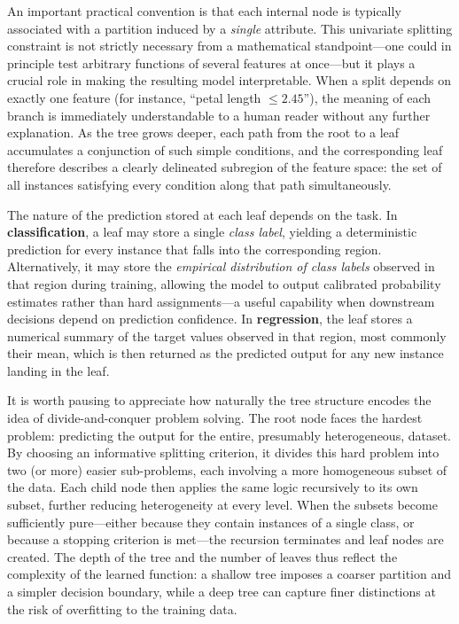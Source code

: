 An important practical convention is that each internal node is typically associated with a
partition induced by a \emph{single} attribute. This univariate splitting constraint is not
strictly necessary from a mathematical standpoint---one could in principle test arbitrary
functions of several features at once---but it plays a crucial role in making the resulting
model interpretable. When a split depends on exactly one feature (for instance, ``petal
length $\leq 2.45$''), the meaning of each branch is immediately understandable to a human
reader without any further explanation. As the tree grows deeper, each path from the root
to a leaf accumulates a conjunction of such simple conditions, and the corresponding leaf
therefore describes a clearly delineated subregion of the feature space: the set of all
instances satisfying every condition along that path simultaneously.

The nature of the prediction stored at each leaf depends on the task. In
\textbf{classification}, a leaf may store a single \emph{class label}, yielding a
deterministic prediction for every instance that falls into the corresponding region.
Alternatively, it may store the \emph{empirical distribution of class labels} observed in
that region during training, allowing the model to output calibrated probability estimates
rather than hard assignments---a useful capability when downstream decisions depend on
prediction confidence. In \textbf{regression}, the leaf stores a numerical summary of the
target values observed in that region, most commonly their mean, which is then returned as
the predicted output for any new instance landing in the leaf.

It is worth pausing to appreciate how naturally the tree structure encodes the idea of
divide-and-conquer problem solving. The root node faces the hardest problem: predicting the
output for the entire, presumably heterogeneous, dataset. By choosing an informative
splitting criterion, it divides this hard problem into two (or more) easier sub-problems,
each involving a more homogeneous subset of the data. Each child node then applies the same
logic recursively to its own subset, further reducing heterogeneity at every level. When the
subsets become sufficiently pure---either because they contain instances of a single class,
or because a stopping criterion is met---the recursion terminates and leaf nodes are created.
The depth of the tree and the number of leaves thus reflect the complexity of the learned
function: a shallow tree imposes a coarser partition and a simpler decision boundary, while
a deep tree can capture finer distinctions at the risk of overfitting to the training data.

